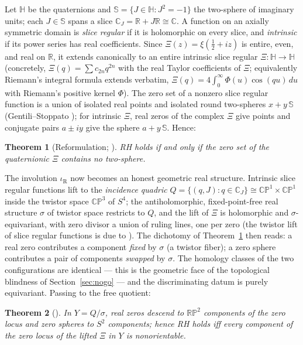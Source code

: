 \documentclass[11pt]{amsart}
\newtheorem{theorem}{Theorem}[section]
\theoremstyle{definition}
\theoremstyle{remark}
\newcommand{\CC}{\mathbb{C}}
\newcommand{\RR}{\mathbb{R}}
\newcommand{\HH}{\mathbb{H}}
\renewcommand{\SS}{\mathbb{S}}
\newcommand{\CP}{\mathbb{CP}}
\begin{document}
Let $\HH$ be the quaternions and $\SS=\{J\in\HH:J^2=-1\}$ the two-sphere of imaginary units; each $J\in\SS$ spans a slice $\CC_J=\RR+J\RR\cong\CC$. A function on an axially symmetric domain is \emph{slice regular} \cite{GentiliStruppa} if it is holomorphic on every slice, and \emph{intrinsic} if its power series has real coefficients. Since $\Xi(z)=\xi(\tfrac12+iz)$ is entire, even, and real on $\RR$, it extends canonically to an entire intrinsic slice regular $\Xi:\HH\to\HH$ (concretely, $\Xi(q)=\sum c_{2n}q^{2n}$ with the real Taylor coefficients of $\Xi$; equivalently Riemann's integral formula extends verbatim, $\Xi(q)=4\int_0^\infty\Phi(u)\cos(qu)\,du$ with Riemann's positive kernel $\Phi$). The zero set of a nonzero slice regular function is a union of isolated real points and isolated round two-spheres $x+y\,\SS$ (Gentili--Stoppato \cite{GentiliStoppato}); for intrinsic $\Xi$, real zeros of the complex $\Xi$ give points and conjugate pairs $a\pm iy$ give the sphere $a+y\,\SS$. Hence:
\begin{theorem}[{Reformulation; \cite{ZS}}]\label{thm:reform}
RH holds if and only if the zero set of the quaternionic $\Xi$ contains no two-sphere.
\end{theorem}

The involution $\iota_{\mathrm{R}}$ now becomes an honest geometric real structure. Intrinsic slice regular functions lift to the \emph{incidence quadric} $Q=\{(q,J):q\in\CC_J\}\cong\CP^1\times\CP^1$ inside the twistor space $\CP^3$ of $S^4$; the antiholomorphic, fixed-point-free real structure $\sigma$ of twistor space restricts to $Q$, and the lift of $\Xi$ is holomorphic and $\sigma$-equivariant, with zero divisor a union of ruling lines, one per zero \cite{ZS} (the twistor lift of slice regular functions is due to \cite{GentiliSalamonStoppato}). The dichotomy of Theorem~\ref{thm:reform} then reads:
a real zero contributes a component \emph{fixed} by $\sigma$ (a twistor fiber); a zero sphere contributes a pair of components \emph{swapped} by $\sigma$. The homology classes of the two configurations are identical --- this is the geometric face of the topological blindness of Section~\ref{sec:nogo} --- and the discriminating datum is purely equivariant. Passing to the free quotient:
\begin{theorem}[{\cite{ZS}}]\label{thm:orient}
In $Y=Q/\sigma$, real zeros descend to $\mathbb{RP}^2$ components of the zero locus and zero spheres to $S^2$ components; hence \emph{RH holds iff every component of the zero locus of the lifted $\Xi$ in $Y$ is nonorientable}.
\end{theorem}
\end{document}
